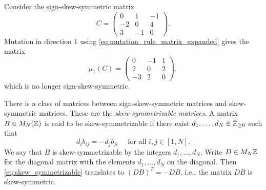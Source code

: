 \begin{example}
	Consider the sign-skew-symmetric matrix
	\begin{equation*}
		C = \begin{pmatrix}
			0  & 1  & -1 \\
			-2 & 0  & 4  \\
			3  & -1 & 0
		\end{pmatrix}.
	\end{equation*}
	Mutation in direction $1$ using \cref{eq:mutation_rule_matrix_expanded} gives the
	matrix
	\begin{equation*}
		\mu_1(C) = \begin{pmatrix}
			0  & -1 & 1 \\
			2  & 0  & 2 \\
			-3 & 2  & 0
		\end{pmatrix},
	\end{equation*}
	which is no longer sign-skew-symmetric.
\end{example}

There is a class of matrices between sign-skew-symmetric matrices and skew-symmetric
matrices. These are the \emph{skew-symmetrizable
	matrices}. A matrix $B \in M_N(\mathbb{Z})$ is said to be
skew-symmetrizable if there exist $d_1, \dots, d_N \in \mathbb{Z}_{\geq 0}$ such that
\begin{equation}\label{eq:skew_symmetrizable}
	d_i b_{ij} = -d_j b_{ji}\quad  \text{ for all } i,j \in [1, N].
\end{equation}
%
We say that $B$ is skew-symmetrizable by the integers $d_1, \dots, d_N$. Write $D \in
	M_N{\mathbb{Z}}$ for the diagonal matrix with the elements $d_1, \dots, d_N$ on the diagonal.
Then \cref{eq:skew_symmetrizable} translates to $(DB)^T = -DB$, i.e., the matrix $DB$
is skew-symmetric.

